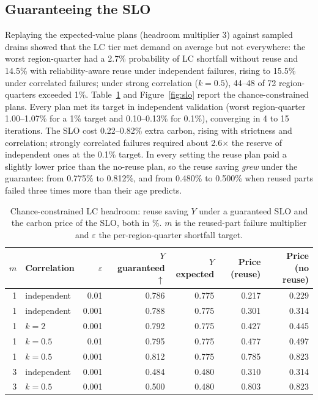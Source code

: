 \subsection{Guaranteeing the SLO}
Replaying the expected-value plans (headroom multiplier 3) against sampled drains showed that the LC tier met demand on average but not everywhere: the worst region-quarter had a 2.7\% probability of LC shortfall without reuse and 14.5\% with reliability-aware reuse under independent failures, rising to 15.5\% under correlated failures; under strong correlation ($k=0.5$), 44--48 of 72 region-quarters exceeded 1\%. Table~\ref{tab:slo} and Figure~\ref{fig:slo} report the chance-constrained plans. Every plan met its target in independent validation (worst region-quarter 1.00--1.07\% for a 1\% target and 0.10--0.13\% for 0.1\%), converging in 4 to 15 iterations. The SLO cost 0.22--0.82\% extra carbon, rising with strictness and correlation; strongly correlated failures required about 2.6$\times$ the reserve of independent ones at the 0.1\% target. In every setting the reuse plan paid a slightly lower price than the no-reuse plan, so the reuse saving \emph{grew} under the guarantee: from 0.775\% to 0.812\%, and from 0.480\% to 0.500\% when reused parts failed three times more than their age predicts.

\begin{table}[t]
  \centering
  \caption{Chance-constrained LC headroom: reuse saving $Y$ under a guaranteed SLO and the carbon price of the SLO, both in \%. $m$ is the reused-part failure multiplier and $\varepsilon$ the per-region-quarter shortfall target.}
  \label{tab:slo}
  \begin{tabular}{rlrrrrr}
    \toprule
    $m$ & Correlation & $\varepsilon$ & $Y$ guaranteed $\uparrow$ & $Y$ expected & Price (reuse) & Price (no reuse) \\
    \midrule
    1 & independent & 0.01 & 0.786 & 0.775 & 0.217 & 0.229 \\
    1 & independent & 0.001 & 0.788 & 0.775 & 0.301 & 0.314 \\
    1 & $k=2$ & 0.001 & 0.792 & 0.775 & 0.427 & 0.445 \\
    1 & $k=0.5$ & 0.01 & 0.795 & 0.775 & 0.477 & 0.497 \\
    1 & $k=0.5$ & 0.001 & 0.812 & 0.775 & 0.785 & 0.823 \\
    3 & independent & 0.001 & 0.484 & 0.480 & 0.310 & 0.314 \\
    3 & $k=0.5$ & 0.001 & 0.500 & 0.480 & 0.803 & 0.823 \\
    \bottomrule
  \end{tabular}
\end{table}

